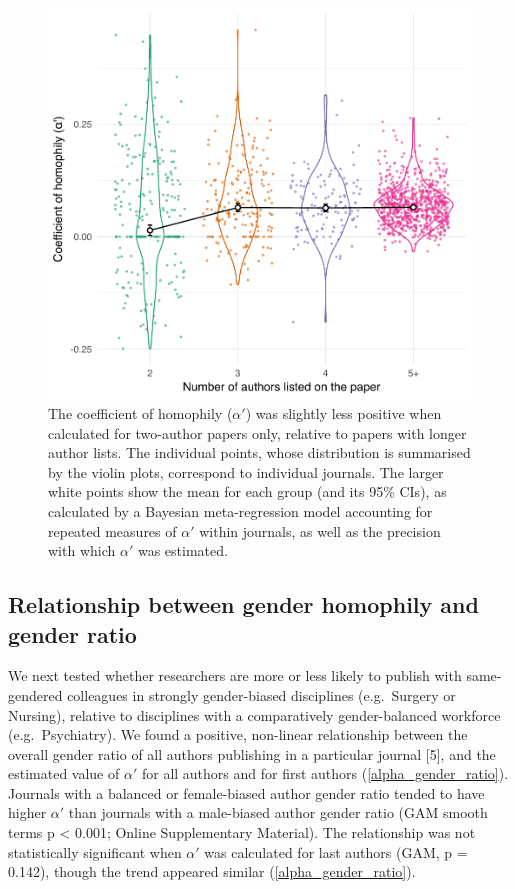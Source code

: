 \documentclass[12pt,]{article}
\begin{document}
\begin{figure}[htbp]
\centering
\includegraphics{../figures/Fig3.pdf}
\caption{The coefficient of homophily (\(\alpha'\)) was slightly less
positive when calculated for two-author papers only, relative to papers
with longer author lists. The individual points, whose distribution is
summarised by the violin plots, correspond to individual journals. The
larger white points show the mean for each group (and its 95\% CIs), as
calculated by a Bayesian meta-regression model accounting for repeated
measures of \(\alpha'\) within journals, as well as the precision with
which \(\alpha'\) was estimated. \label{author_number}}
\end{figure}

\subsection{Relationship between gender homophily and gender
ratio}\label{relationship-between-gender-homophily-and-gender-ratio}

We next tested whether researchers are more or less likely to publish
with same-gendered colleagues in strongly gender-biased disciplines
(e.g.~Surgery or Nursing), relative to disciplines with a comparatively
gender-balanced workforce (e.g.~Psychiatry). We found a positive,
non-linear relationship between the overall gender ratio of all authors
publishing in a particular journal {[}5{]}, and the estimated value of
\(\alpha'\) for all authors and for first authors
(\autoref{alpha_gender_ratio}). Journals with a balanced or
female-biased author gender ratio tended to have higher \(\alpha'\) than
journals with a male-biased author gender ratio (GAM smooth terms p
\textless{} 0.001; Online Supplementary Material). The relationship was
not statistically significant when \(\alpha'\) was calculated for last
authors (GAM, p = 0.142), though the trend appeared similar
(\autoref{alpha_gender_ratio}).
\end{document}
